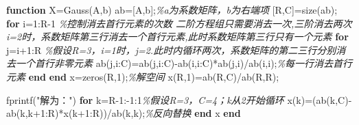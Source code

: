 \documentclass[
]{article}
\newenvironment{Shaded}{}{}
\newcommand{\CommentTok}[1]{\textcolor[rgb]{0.38,0.63,0.69}{\textit{#1}}}
\newcommand{\FloatTok}[1]{\textcolor[rgb]{0.25,0.63,0.44}{#1}}
\newcommand{\KeywordTok}[1]{\textcolor[rgb]{0.00,0.44,0.13}{\textbf{#1}}}
\newcommand{\NormalTok}[1]{#1}
\newcommand{\OperatorTok}[1]{\textcolor[rgb]{0.40,0.40,0.40}{#1}}
\newcommand{\StringTok}[1]{\textcolor[rgb]{0.25,0.44,0.63}{#1}}
\newcommand{\VariableTok}[1]{\textcolor[rgb]{0.10,0.09,0.49}{#1}}
\begin{document}
\begin{Shaded}
\begin{Highlighting}[]
\KeywordTok{function} \VariableTok{X}\OperatorTok{=}\VariableTok{Gauss}\NormalTok{(}\VariableTok{A}\OperatorTok{,}\VariableTok{b}\NormalTok{)}
\VariableTok{ab}\OperatorTok{=}\NormalTok{[}\VariableTok{A}\OperatorTok{,}\VariableTok{b}\NormalTok{]}\OperatorTok{;}\CommentTok{\%a为系数矩阵，b为右端项}
\NormalTok{[}\VariableTok{R}\OperatorTok{,}\VariableTok{C}\NormalTok{]}\OperatorTok{=}\VariableTok{size}\NormalTok{(}\VariableTok{ab}\NormalTok{)}\OperatorTok{;}
\KeywordTok{for} \VariableTok{i}\OperatorTok{=}\FloatTok{1}\OperatorTok{:}\VariableTok{R}\OperatorTok{{-}}\FloatTok{1} \CommentTok{\%控制消去首行元素的次数 二阶方程组只需要消去一次,三阶消去两次                   i=2时，系数矩阵第三行消去一个首行元素,此时系数矩阵第三行只有一个元素}
    \KeywordTok{for} \VariableTok{j}\OperatorTok{=}\VariableTok{i}\OperatorTok{+}\FloatTok{1}\OperatorTok{:}\VariableTok{R}                                                                          \CommentTok{\%假设R=3，i=1时，j=2.此时内循环两次，系数矩阵的第二三行分别消去一个首行非零元素}
        \VariableTok{ab}\NormalTok{(}\VariableTok{j}\OperatorTok{,}\VariableTok{i}\OperatorTok{:}\VariableTok{C}\NormalTok{)}\OperatorTok{=}\VariableTok{ab}\NormalTok{(}\VariableTok{j}\OperatorTok{,}\VariableTok{i}\OperatorTok{:}\VariableTok{C}\NormalTok{)}\OperatorTok{{-}}\VariableTok{ab}\NormalTok{(}\VariableTok{i}\OperatorTok{,}\VariableTok{i}\OperatorTok{:}\VariableTok{C}\NormalTok{)}\OperatorTok{*}\VariableTok{ab}\NormalTok{(}\VariableTok{j}\OperatorTok{,}\VariableTok{i}\NormalTok{)}\OperatorTok{/}\VariableTok{ab}\NormalTok{(}\VariableTok{i}\OperatorTok{,}\VariableTok{i}\NormalTok{)}\OperatorTok{;}\CommentTok{\%每一行消去首行元素}
    \KeywordTok{end}
\KeywordTok{end}
\VariableTok{x}\OperatorTok{=}\VariableTok{zeros}\NormalTok{(}\VariableTok{R}\OperatorTok{,}\FloatTok{1}\NormalTok{)}\OperatorTok{;}\CommentTok{\%解空间}
\VariableTok{x}\NormalTok{(}\VariableTok{R}\OperatorTok{,}\FloatTok{1}\NormalTok{)}\OperatorTok{=}\VariableTok{ab}\NormalTok{(}\VariableTok{R}\OperatorTok{,}\VariableTok{C}\NormalTok{)}\OperatorTok{/}\VariableTok{ab}\NormalTok{(}\VariableTok{R}\OperatorTok{,}\VariableTok{R}\NormalTok{)}\OperatorTok{;}

\VariableTok{fprintf}\NormalTok{(}\StringTok{"解为："}\NormalTok{)}
\KeywordTok{for} \VariableTok{k}\OperatorTok{=}\VariableTok{R}\OperatorTok{{-}}\FloatTok{1}\OperatorTok{:{-}}\FloatTok{1}\OperatorTok{:}\FloatTok{1}\CommentTok{\%假设R=3，C=4；k从2开始循环}
    \VariableTok{x}\NormalTok{(}\VariableTok{k}\NormalTok{)}\OperatorTok{=}\NormalTok{(}\VariableTok{ab}\NormalTok{(}\VariableTok{k}\OperatorTok{,}\VariableTok{C}\NormalTok{)}\OperatorTok{{-}}\VariableTok{ab}\NormalTok{(}\VariableTok{k}\OperatorTok{,}\VariableTok{k}\OperatorTok{+}\FloatTok{1}\OperatorTok{:}\VariableTok{R}\NormalTok{)}\OperatorTok{*}\VariableTok{x}\NormalTok{(}\VariableTok{k}\OperatorTok{+}\FloatTok{1}\OperatorTok{:}\VariableTok{R}\NormalTok{))}\OperatorTok{/}\VariableTok{ab}\NormalTok{(}\VariableTok{k}\OperatorTok{,}\VariableTok{k}\NormalTok{)}\OperatorTok{;}\CommentTok{\%反向替换}
\KeywordTok{end}
\VariableTok{x}
\KeywordTok{end}
\end{Highlighting}
\end{Shaded}
\end{document}
